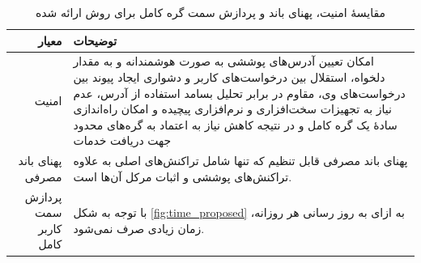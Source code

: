 \begin{xltabular}{\textwidth}{|r|X|}
	\caption{
		مقایسهٔ  امنیت، پهنای باند و پردازش سمت گره کامل برای روش ارائه شده
		\label{table:Proposed}}\\
	\hline
	\textbf{معیار} & \textbf{توضیحات} \\
	\hline
	{%
		امنیت
	}&{%
		امکان تعیین آدرس‌های پوششی به صورت هوشمندانه و به مقدار دلخواه، استقلال بین درخواست‌های کاربر و دشواری ایجاد پیوند بین درخواست‌های وی، مقاوم در برابر تحلیل بسامد استفاده از آدرس، عدم نیاز به تجهیزات سخت‌افزاری و نرم‌افزاری پیچیده و امکان راه‌اندازی ساده‌ٔ یک گره کامل و در نتیجه کاهش نیاز به اعتماد به گره‌های محدود جهت دریافت خدمات
	}\\
	\hline
	{%
		پهنای باند مصرفی
	}&{%
		پهنای باند مصرفی قابل تنظیم که تنها شامل تراکنش‌های اصلی به علاوه تراکنش‌های پوششی و اثبات مرکل آن‌ها است.
	}\\
	\hline
	{%
		پردازش سمت کاربر کامل
	} & {%
	با توجه به شکل \ref{fig:time_proposed} به ازای به روز رسانی هر روزانه، زمان زیادی صرف نمی‌شود.
}\\
\hline
\end{xltabular}





